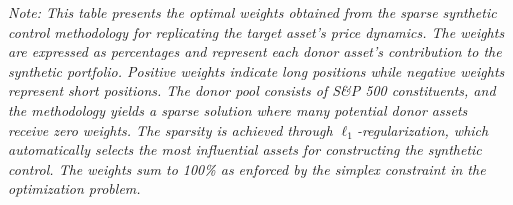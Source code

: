 \begin{table}[H]
\vspace{0.5cm}
\begin{minipage}{\textwidth}
\setlength{\parindent}{0pt}
\small\textit{Note: 
This table presents the optimal weights obtained from the sparse synthetic control methodology for replicating the target asset's price dynamics. The weights are expressed as percentages and represent each donor asset's contribution to the synthetic portfolio. Positive weights indicate long positions while negative weights represent short positions. The donor pool consists of S\&P 500 constituents, and the methodology yields a sparse solution where many potential donor assets receive zero weights. The sparsity is achieved through $\ell_1$-regularization, which automatically selects the most influential assets for constructing the synthetic control. The weights sum to 100\% as enforced by the simplex constraint in the optimization problem.
}
\end{minipage}
\end{table}


